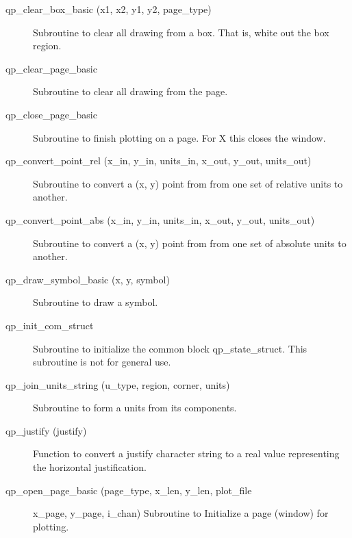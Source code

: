 \begin{description}

\label{r:qp.clear.box.basic}
\item[qp_clear_box_basic (x1, x2, y1, y2, page_type)] \Newline 
Subroutine to clear all drawing from a box.
That is, white out the box region.

\label{r:qp.clear.page.basic}
\item[qp_clear_page_basic] \Newline 
Subroutine to clear all drawing from the page.

\label{r:qp.close.page.basic}
\item[qp_close_page_basic] \Newline 
Subroutine to finish plotting on a page.
For X this closes the window.

\label{r:qp.convert.point.rel}
\item[qp_convert_point_rel (x_in, y_in, units_in, x_out, y_out, units_out)] \Newline 
Subroutine to convert a (x, y) point from from
one set of relative units to another.

\label{r:qp.convert.point.abs}
\item[qp_convert_point_abs (x_in, y_in, units_in, x_out, y_out, units_out)] \Newline 
Subroutine to convert a (x, y) point from from
one set of absolute units to another.

\label{r:qp.draw.symbol.basic}
\item[qp_draw_symbol_basic (x, y, symbol)] \Newline 
Subroutine to draw a symbol.

\label{r:qp.init.com.struct}
\item[qp_init_com_struct ] \Newline 
Subroutine to initialize the common block qp_state_struct.
This subroutine is not for general use.

\label{r:qp.join.units.string}
\item[qp_join_units_string (u_type, region, corner, units)] \Newline 
Subroutine to form a units from its components.

\label{r:qp.justify}
\item[qp_justify (justify)] \Newline 
     Function to convert a justify character string to a real value
     representing the horizontal justification. 

\label{r:qp.open.page.basic}
\item[qp_open_page_basic (page_type, x_len, y_len, plot_file] \Newline 
      x_page, y_page, i_chan)
Subroutine to Initialize a page (window) for plotting.


\end{description}
